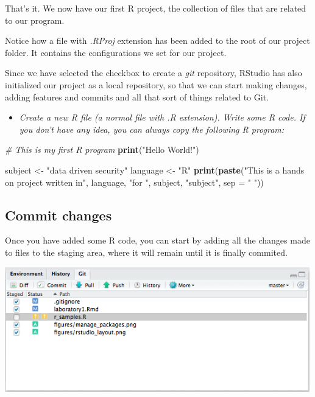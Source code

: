 \documentclass[]{article}
\newenvironment{Shaded}{\begin{snugshade}}{\end{snugshade}}
\newcommand{\KeywordTok}[1]{\textcolor[rgb]{0.13,0.29,0.53}{\textbf{#1}}}
\newcommand{\DataTypeTok}[1]{\textcolor[rgb]{0.13,0.29,0.53}{#1}}
\newcommand{\StringTok}[1]{\textcolor[rgb]{0.31,0.60,0.02}{#1}}
\newcommand{\CommentTok}[1]{\textcolor[rgb]{0.56,0.35,0.01}{\textit{#1}}}
\newcommand{\NormalTok}[1]{#1}
\providecommand{\tightlist}{%
  \setlength{\itemsep}{0pt}\setlength{\parskip}{0pt}}
\begin{document}
That's it. We now have our first R project, the collection of files that
are related to our program.

Notice how a file with \emph{.RProj} extension has been added to the
root of our project folder. It contains the configurations we set for
our project.

Since we have selected the checkbox to create a \emph{git} repository,
RStudio has also initialized our project as a local repository, so that
we can start making changes, adding features and commits and all that
sort of things related to Git.

\begin{itemize}
\tightlist
\item
  \emph{Create a new R file (a normal file with .R extension). Write
  some R code. If you don't have any idea, you can always copy the
  following R program:}
\end{itemize}

\begin{Shaded}
\begin{Highlighting}[]
\CommentTok{# This is my first R program}
\KeywordTok{print}\NormalTok{(}\StringTok{"Hello World!"}\NormalTok{)}

\NormalTok{subject   <-}\StringTok{ "data driven security"}
\NormalTok{language  <-}\StringTok{ "R"}
\KeywordTok{print}\NormalTok{(}\KeywordTok{paste}\NormalTok{(}\StringTok{"This is a hands on project written in"}\NormalTok{,}
\NormalTok{            language,}
            \StringTok{"for "}\NormalTok{,}
\NormalTok{            subject,}
            \StringTok{"subject"}\NormalTok{,}
            \DataTypeTok{sep =} \StringTok{" "}\NormalTok{))}
\end{Highlighting}
\end{Shaded}

\subsection{Commit changes}\label{commit-changes}

Once you have added some R code, you can start by adding all the changes
made to files to the staging area, where it will remain until it is
finally commited.

\begin{center}\includegraphics[width=500px]{figures/git_staging} \end{center}
\end{document}
